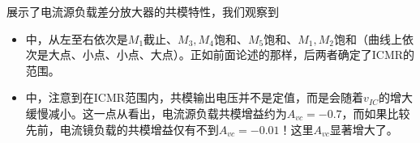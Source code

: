 展示了电流源负载差分放大器的共模特性，我们观察到
\begin{itemize}
    \item {}中，从左至右依次是$M_1$截止、$M_3,M_4$饱和、$M_5$饱和、$M_1,M_2$饱和（曲线上依次是大点、小点、小点、大点）。正如前面论述的那样，后两者确定了ICMR的范围。
    \item {}中，注意到在ICMR范围内，共模输出电压并不是定值，而是会随着$v_{IC}$的增大缓慢减小。这一点从看出，电流源负载共模增益约为$A_{vc}=-0.7$，而如果比较先前，电流镜负载的共模增益仅有不到$A_{vc}=-0.01$！这里$A_{vc}$显著增大了。
\end{itemize}


